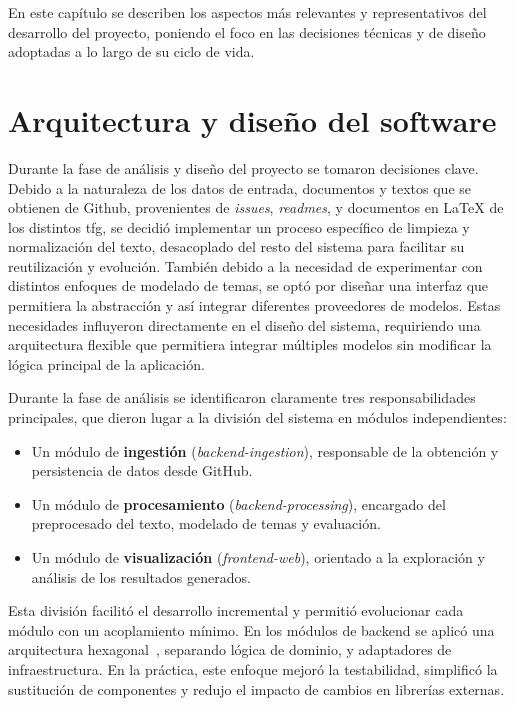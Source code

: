 
En este capítulo se describen los aspectos más relevantes y representativos del
desarrollo del proyecto, poniendo el foco en las decisiones técnicas y de
diseño adoptadas a lo largo de su ciclo de vida.
\section{Arquitectura y diseño del software}

Durante la fase de análisis y diseño del proyecto se tomaron decisiones clave.
Debido a la naturaleza de los datos de entrada, documentos y textos que se
obtienen de Github, provenientes de \textit{issues}, \textit{readmes}, y
documentos en LaTeX de los distintos \acrshort{tfg}, se decidió implementar un
proceso específico de limpieza y normalización del texto, desacoplado del resto
del sistema para facilitar su reutilización y evolución. También debido a la
necesidad de experimentar con distintos enfoques de modelado de temas, se optó
por diseñar una interfaz que permitiera la abstracción y así integrar
diferentes proveedores de modelos. Estas necesidades influyeron directamente en
el diseño del sistema, requiriendo una arquitectura flexible que permitiera
integrar múltiples modelos sin modificar la lógica principal de la aplicación.

Durante la fase de análisis se identificaron claramente tres responsabilidades
principales, que dieron lugar a la división del sistema en módulos
independientes:

\begin{itemize}
      \item Un módulo de \textbf{ingestión} (\textit{backend-ingestion}), responsable de la
            obtención y persistencia de datos desde GitHub.
      \item Un módulo de \textbf{procesamiento} (\textit{backend-processing}), encargado
            del preprocesado del texto, modelado de temas y evaluación.
      \item Un módulo de \textbf{visualización} (\textit{frontend-web}), orientado a la
            exploración y análisis de los resultados generados.
\end{itemize}

Esta división facilitó el desarrollo incremental y permitió evolucionar cada
módulo con un acoplamiento mínimo. En los módulos de backend se aplicó una
arquitectura hexagonal~\cite{HexagonalArchitectureClean2022}, separando lógica
de dominio,  y adaptadores de infraestructura. En la práctica,
este enfoque mejoró la testabilidad, simplificó la sustitución de componentes y
redujo el impacto de cambios en librerías externas.

